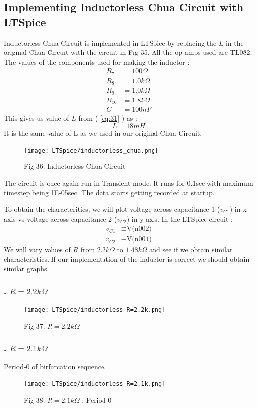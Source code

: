 \documentclass[12pt]{article}
\newcommand*{\myref}[1]{%
  \begingroup
    \hypersetup{
      linkcolor=linkequation,
      linkbordercolor=linkequation,
    }%
    \ref{#1}%
  \endgroup
}
\begin{document}
\subsection{Implementing Inductorless Chua Circuit with LTSpice}
Inductorless Chua Circuit is implemented in LTSpice by replacing the $L$ in the original Chua Circuit with the circuit in Fig 35. \linebreak
All the op-amps used are TL082. \linebreak
The values of the components used for making the inductor :
\begin{align*}
	R_7&= 100\Omega \\
	R_8&=1.0k\Omega \\
	R_9&=1.0k\Omega \\
	R_{10}&=1.8k\Omega \\
	C&=100nF
\end{align*}
This gives us value of $L$ from (\myref{eq:31}) as :
\[ L=18mH \]
It is the same value of L as we used in our original Chua Circuit. 
\begin{figure}[H]
	\centering
	\texttt{[image: LTSpice/inductorless\_chua.png]}
	\caption{Fig 36. Inductorless Chua Circuit}
\end{figure}
The circuit is once again run in Transient mode. It runs for 0.1sec with maximum timestep being 1E-05sec. The data starts getting recorded at startup. \linebreak

To obtain the characteritics, we will plot voltage across capacitance 1 ($v_{C1}$) in x-axis vs voltage across capacitance 2 ($v_{C2}$) in y-axis. In the LTSpice circuit :
\begin{align*}
	v_{C1} &\equiv \text{V(n002)} \\
	v_{C2} &\equiv \text{V(n001)}
\end{align*}
We will vary values of $R$ from $2.2k\Omega$ to $1.48k\Omega$ and see if we obtain similar characteristics. \linebreak
If our implementation of the inductor is correct we should obtain similar graphs.
\subsubsection*{. $R=2.2k\Omega$}
\begin{figure}[H] %
	\centering
	\texttt{[image: LTSpice/inductorless R=2.2k.png]}
	\caption{Fig 37. $R=2.2k\Omega$}
\end{figure}
\subsubsection*{. $R=2.1k\Omega$}
Period-0 of birfurcation sequence.
\begin{figure}[H] %
	\centering 
	\texttt{[image: LTSpice/inductorless R=2.1k.png]}
	\caption{Fig 38. $R=2.1k\Omega$ : Period-0}
\end{figure}
\end{document}
